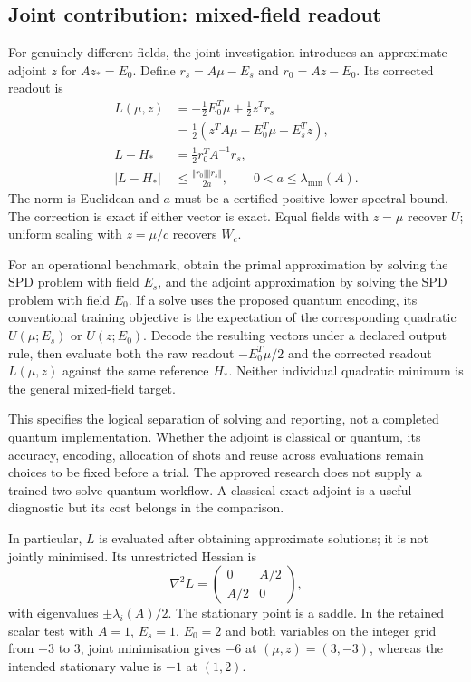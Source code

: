 \documentclass{article}
\begin{document}
\subsection{Joint contribution: mixed-field readout}

For genuinely different fields, the joint investigation introduces an approximate adjoint $z$ for $Az_*=E_0$. Define $r_s=A\mu-E_s$ and $r_0=Az-E_0$. Its corrected readout is
\begin{align}
L(\mu,z)&=-\frac12E_0^T\mu+\frac12z^Tr_s\\
&=\frac12\left(z^TA\mu-E_0^T\mu-E_s^Tz\right),\\
L-H_*&=\frac12r_0^TA^{-1}r_s,\\
|L-H_*|&\leq\frac{\Vert r_0\Vert\Vert r_s\Vert}{2a},\qquad 0<a\leq\lambda_{\min}(A).
\end{align}
The norm is Euclidean and $a$ must be a certified positive lower spectral bound. The correction is exact if either vector is exact. Equal fields with $z=\mu$ recover $U$; uniform scaling with $z=\mu/c$ recovers $W_c$.

For an operational benchmark, obtain the primal approximation by solving the SPD problem with field $E_s$, and the adjoint approximation by solving the SPD problem with field $E_0$. If a solve uses the proposed quantum encoding, its conventional training objective is the expectation of the corresponding quadratic $U(\mu;E_s)$ or $U(z;E_0)$. Decode the resulting vectors under a declared output rule, then evaluate both the raw readout $-E_0^T\mu/2$ and the corrected readout $L(\mu,z)$ against the same reference $H_*$. Neither individual quadratic minimum is the general mixed-field target.

This specifies the logical separation of solving and reporting, not a completed quantum implementation. Whether the adjoint is classical or quantum, its accuracy, encoding, allocation of shots and reuse across evaluations remain choices to be fixed before a trial. The approved research does not supply a trained two-solve quantum workflow. A classical exact adjoint is a useful diagnostic but its cost belongs in the comparison.

In particular, $L$ is evaluated after obtaining approximate solutions; it is not jointly minimised. Its unrestricted Hessian is
\begin{equation}
\nabla^2L=\begin{pmatrix}0&A/2\\A/2&0\end{pmatrix},
\end{equation}
with eigenvalues $\pm\lambda_i(A)/2$. The stationary point is a saddle. In the retained scalar test with $A=1$, $E_s=1$, $E_0=2$ and both variables on the integer grid from $-3$ to $3$, joint minimisation gives $-6$ at $(\mu,z)=(3,-3)$, whereas the intended stationary value is $-1$ at $(1,2)$.
\end{document}
